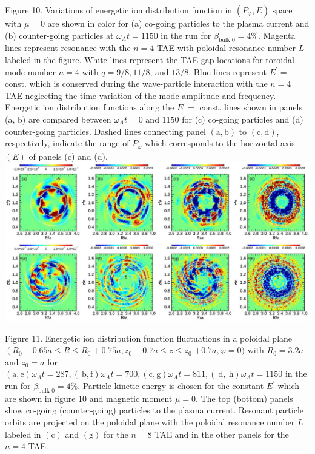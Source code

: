 \documentclass[10pt]{article}
\begin{document}
Figure 10. Variations of energetic ion distribution function in $\left(P_{\varphi}, E\right)$ space with $\mu=0$ are shown in color for (a) co-going particles to the plasma current and (b) counter-going particles at $\omega_{A} t=1150$ in the run for $\beta_{\text {bulk } 0}=4 \%$. Magenta lines represent resonance with the $n=4$ TAE with poloidal resonance number $L$ labeled in the figure. White lines represent the TAE gap locations for toroidal mode number $n=4$ with $q=9 / 8,11 / 8$, and $13 / 8$. Blue lines represent $E^{\prime}=$ const. which is conserved during the wave-particle interaction with the $n=4$ TAE neglecting the time variation of the mode amplitude and frequency. Energetic ion distribution functions along the $E^{\prime}=$ const. lines shown in panels (a, b) are compared between $\omega_{A} t=0$ and 1150 for (c) co-going particles and (d) counter-going particles. Dashed lines connecting panel $(\mathrm{a}, \mathrm{b})$ to $(\mathrm{c}, \mathrm{d})$, respectively, indicate the range of $P_{\varphi}$ which corresponds to the horizontal axis $(E)$ of panels (c) and (d).
\includegraphics[max width=\textwidth, center]{2023_06_04_de2f4b8aa3fd859f006dg-11(1)}

Figure 11. Energetic ion distribution function fluctuations in a poloidal plane $\left(R_{0}-0.65 a \leqslant R \leqslant R_{0}+0.75 a, z_{0}-0.7 a \leqslant z \leqslant z_{0}\right.$ $+0.7 a, \varphi=0)$ with $R_{0}=3.2 a$ and $z_{0}=a$ for $(\mathrm{a}, \mathrm{e}) \omega_{A} t=287,(\mathrm{~b}, \mathrm{f}) \omega_{A} t=700,(\mathrm{c}, \mathrm{g}) \omega_{A} t=811,(\mathrm{~d}, \mathrm{~h}) \omega_{A} t=1150$ in the run for $\beta_{\text {bulk } 0}=4 \%$. Particle kinetic energy is chosen for the constant $E^{\prime}$ which are shown in figure 10 and magnetic moment $\mu=0$. The top (bottom) panels show co-going (counter-going) particles to the plasma current. Resonant particle orbits are projected on the poloidal plane with the poloidal resonance number $L$ labeled in $(\mathrm{c})$ and $(\mathrm{g})$ for the $n=8$ TAE and in the other panels for the $n=4$ TAE.
\end{document}
